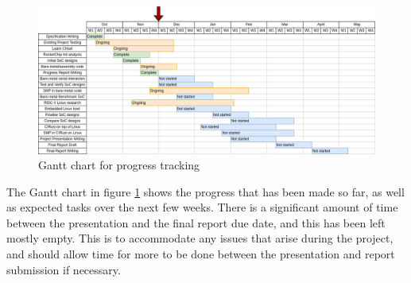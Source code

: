 \begin{landscape}
    \begin{figure}[]
        \centering
        \includegraphics[scale=0.6]{./img/Gantt progress report.drawio.png}
        \caption{Gantt chart for progress tracking}
        \label{fig:Gantt}
    \end{figure}
\end{landscape}
\restoregeometry
The Gantt\cite{gantt-chart} chart in figure \ref{fig:Gantt} shows the progress that has been made so far, as well as expected tasks over the next few weeks. There is a significant amount of time between the presentation and the final report due date, and this has been left mostly empty. This is to accommodate any issues that arise during the project, and should allow time for more to be done between the presentation and report submission if necessary.